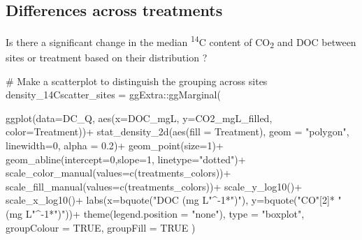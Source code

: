 \documentclass[
  letterpaper,
  DIV=11,
  numbers=noendperiod]{scrartcl}
\newenvironment{Shaded}{\begin{snugshade}}{\end{snugshade}}
\newcommand{\AttributeTok}[1]{\textcolor[rgb]{0.40,0.45,0.13}{#1}}
\newcommand{\CommentTok}[1]{\textcolor[rgb]{0.37,0.37,0.37}{#1}}
\newcommand{\ConstantTok}[1]{\textcolor[rgb]{0.56,0.35,0.01}{#1}}
\newcommand{\DecValTok}[1]{\textcolor[rgb]{0.68,0.00,0.00}{#1}}
\newcommand{\FloatTok}[1]{\textcolor[rgb]{0.68,0.00,0.00}{#1}}
\newcommand{\FunctionTok}[1]{\textcolor[rgb]{0.28,0.35,0.67}{#1}}
\newcommand{\NormalTok}[1]{\textcolor[rgb]{0.00,0.23,0.31}{#1}}
\newcommand{\OtherTok}[1]{\textcolor[rgb]{0.00,0.23,0.31}{#1}}
\newcommand{\SpecialCharTok}[1]{\textcolor[rgb]{0.37,0.37,0.37}{#1}}
\newcommand{\StringTok}[1]{\textcolor[rgb]{0.13,0.47,0.30}{#1}}
\begin{document}
\subsection{Differences across
treatments}\label{differences-across-treatments}

Is there a significant change in the median \textsuperscript{14}C
content of CO\textsubscript{2} and DOC between sites or treatment based
on their distribution ?

\begin{Shaded}
\begin{Highlighting}[]
\CommentTok{\# Make a scatterplot to distinguish the grouping across sites}
\NormalTok{density\_14Cscatter\_sites }\OtherTok{=} 
\NormalTok{  ggExtra}\SpecialCharTok{::}\FunctionTok{ggMarginal}\NormalTok{(}
  
            \FunctionTok{ggplot}\NormalTok{(}\AttributeTok{data=}\NormalTok{DC\_Q,}
                 \FunctionTok{aes}\NormalTok{(}\AttributeTok{x=}\NormalTok{DOC\_mgL, }\AttributeTok{y=}\NormalTok{CO2\_mgL\_filled, }
                    \AttributeTok{color=}\NormalTok{Treatment))}\SpecialCharTok{+}
            \FunctionTok{stat\_density\_2d}\NormalTok{(}\FunctionTok{aes}\NormalTok{(}\AttributeTok{fill =}\NormalTok{ Treatment), }\AttributeTok{geom =} \StringTok{"polygon"}\NormalTok{, }\AttributeTok{linewidth=}\DecValTok{0}\NormalTok{,}
                             \AttributeTok{alpha =} \FloatTok{0.2}\NormalTok{)}\SpecialCharTok{+} 
            \FunctionTok{geom\_point}\NormalTok{(}\AttributeTok{size=}\DecValTok{1}\NormalTok{)}\SpecialCharTok{+}
            \FunctionTok{geom\_abline}\NormalTok{(}\AttributeTok{intercept=}\DecValTok{0}\NormalTok{,}\AttributeTok{slope=}\DecValTok{1}\NormalTok{, }\AttributeTok{linetype=}\StringTok{"dotted"}\NormalTok{)}\SpecialCharTok{+}
            \FunctionTok{scale\_color\_manual}\NormalTok{(}\AttributeTok{values=}\FunctionTok{c}\NormalTok{(treatments\_colors))}\SpecialCharTok{+}
            \FunctionTok{scale\_fill\_manual}\NormalTok{(}\AttributeTok{values=}\FunctionTok{c}\NormalTok{(treatments\_colors))}\SpecialCharTok{+}
            \FunctionTok{scale\_y\_log10}\NormalTok{()}\SpecialCharTok{+}
              \FunctionTok{scale\_x\_log10}\NormalTok{()}\SpecialCharTok{+}
            \FunctionTok{labs}\NormalTok{(}\AttributeTok{x=}\FunctionTok{bquote}\NormalTok{(}\StringTok{"DOC (mg L"}\SpecialCharTok{\^{}{-}}\DecValTok{1}\SpecialCharTok{*}\StringTok{")"}\NormalTok{), }
                   \AttributeTok{y=}\FunctionTok{bquote}\NormalTok{(}\StringTok{"CO"}\NormalTok{[}\DecValTok{2}\NormalTok{]}\SpecialCharTok{*} \StringTok{" (mg L"}\SpecialCharTok{\^{}{-}}\DecValTok{1}\SpecialCharTok{*}\StringTok{")"}\NormalTok{))}\SpecialCharTok{+}
              \FunctionTok{theme}\NormalTok{(}\AttributeTok{legend.position =} \StringTok{"none"}\NormalTok{), }
            \AttributeTok{type =} \StringTok{"boxplot"}\NormalTok{, }\AttributeTok{groupColour =} \ConstantTok{TRUE}\NormalTok{, }\AttributeTok{groupFill =} \ConstantTok{TRUE}\NormalTok{ ) }



\end{Highlighting}
\end{Shaded}
\end{document}
